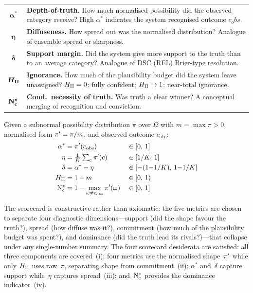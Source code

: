 \noindent
\renewcommand{\arraystretch}{1.25}
\begin{tabularx}{\columnwidth}{%
    >{\columncolor{rationalecolor!10}}c X}
$\boldsymbol{\alpha^*}$ & \textbf{Depth-of-truth.} How much normalised
    possibility did the observed category receive? High $\alpha^*$ indicates the system recognised outcome $c_obs$. \\
$\boldsymbol{\eta}$ & \textbf{Diffuseness.} How spread out was the
    normalised distribution? Analogue of ensemble spread or sharpness. \\
$\boldsymbol{\delta}$ & \textbf{Support margin.} Did the system give
    more support to the truth than to an average category?
    Analogue of DSC (REL) Brier-type resolution. \\
$\boldsymbol{H_{\Pi}}$ & \textbf{Ignorance.} How much of the plausibility
    budget did the system leave unassigned? $H_{\Pi} = 0$: fully
    confident; $H_{\Pi} \to 1$: near-total ignorance. \\
$\boldsymbol{\mathrm{N}_{\mathrm{c}}^*}$ & \textbf{Cond.\ necessity of truth.} Was truth a clear winner? A conceptual merging of recognition and conviction. \\
\end{tabularx}
\renewcommand{\arraystretch}{1.0}

\begin{rhoenv}[frametitle={Definition (Five-Number Possibilistic Scorecard)}]
Given a subnormal possibility distribution $\pi$ over $\Omega$ with
$m = \max\pi > 0$, normalised form $\pi' = \pi/m$, and observed
outcome $c_{\mathrm{obs}}$:
\begin{align*}
\alpha^* &= \pi'(c_{\mathrm{obs}}) &&\in [0,\,1] \\
\eta &= \tfrac{1}{K}\textstyle\sum_{c}\pi'(c) &&\in [1/K,\,1] \\
\delta &= \alpha^* - \eta &&\in [-(1{-}1/K),\,1{-}1/K] \\
H_{\Pi} &= 1 - m &&\in [0,\,1) \\
\mathrm{N}_{\mathrm{c}}^* &= 1 - \max_{\omega \neq c_{\mathrm{obs}}} \pi'(\omega) &&\in [0,\,1]
\end{align*}
\end{rhoenv}

The scorecard is constructive rather than axiomatic:
the five metrics are chosen to separate four
diagnostic dimensions---support (did the shape
favour the truth?), spread (how diffuse was it?),
commitment (how much of the plausibility budget was
spent?), and dominance (did the truth lead
its rivals?)---that collapse under any single-number summary.
The four scorecard desiderata are satisfied: all three components are
covered~(i); four metrics use the normalised
shape~$\pi'$ while only
$H_{\Pi}$ uses raw~$\pi$, separating shape from commitment~(ii);
$\alpha^*$ and~$\delta$ capture support while~$\eta$ captures
spread~(iii); and~$\mathrm{N}_{\mathrm{c}}^*$ provides the dominance indicator~(iv).


